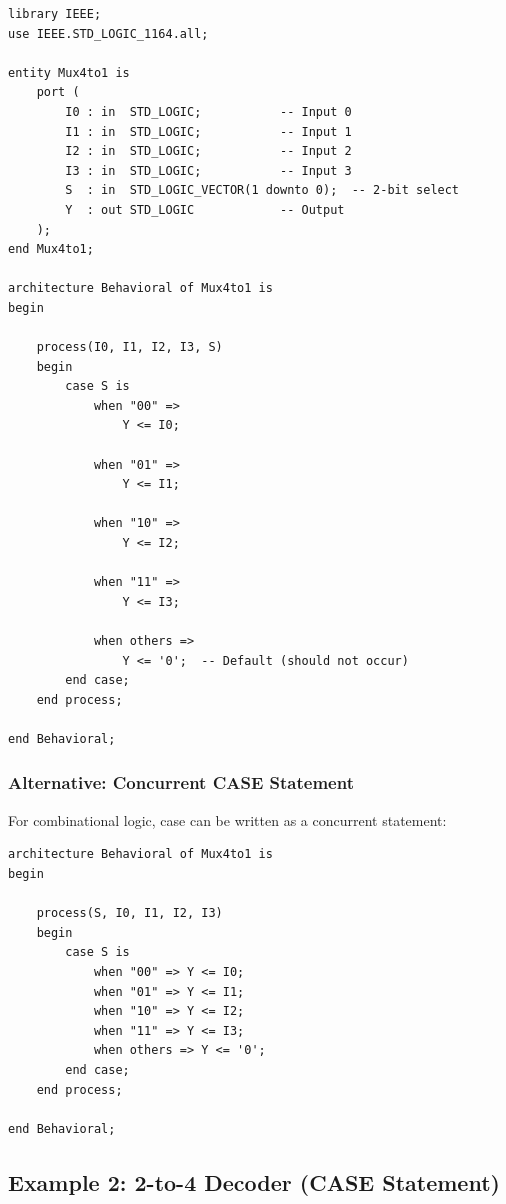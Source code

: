 \documentclass[12pt,a4paper]{article}
\begin{document}
\begin{lstlisting}
library IEEE;
use IEEE.STD_LOGIC_1164.all;

entity Mux4to1 is
    port (
        I0 : in  STD_LOGIC;           -- Input 0
        I1 : in  STD_LOGIC;           -- Input 1
        I2 : in  STD_LOGIC;           -- Input 2
        I3 : in  STD_LOGIC;           -- Input 3
        S  : in  STD_LOGIC_VECTOR(1 downto 0);  -- 2-bit select
        Y  : out STD_LOGIC            -- Output
    );
end Mux4to1;

architecture Behavioral of Mux4to1 is
begin
    
    process(I0, I1, I2, I3, S)
    begin
        case S is
            when "00" =>
                Y <= I0;
            
            when "01" =>
                Y <= I1;
            
            when "10" =>
                Y <= I2;
            
            when "11" =>
                Y <= I3;
            
            when others =>
                Y <= '0';  -- Default (should not occur)
        end case;
    end process;
    
end Behavioral;
\end{lstlisting}

\subsubsection{Alternative: Concurrent CASE Statement}

For combinational logic, case can be written as a concurrent statement:

\begin{lstlisting}
architecture Behavioral of Mux4to1 is
begin
    
    process(S, I0, I1, I2, I3)
    begin
        case S is
            when "00" => Y <= I0;
            when "01" => Y <= I1;
            when "10" => Y <= I2;
            when "11" => Y <= I3;
            when others => Y <= '0';
        end case;
    end process;
    
end Behavioral;
\end{lstlisting}

\newpage

\subsection{Example 2: 2-to-4 Decoder (CASE Statement)}
\end{document}
